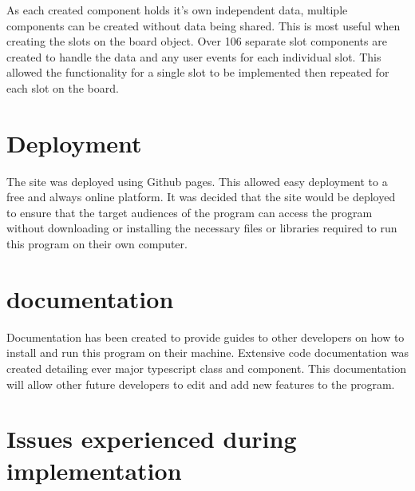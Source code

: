 \documentclass{l4proj}
\begin{document}
As each created component holds it's own independent data, multiple components can be created without data being shared. This is most useful when creating the slots on the board object. Over 106 separate slot components are created to handle the data and any user events for each individual slot. This allowed the functionality for a single slot to be implemented then repeated for each slot on the board.

\section{Deployment}
The site was deployed using Github pages. This allowed easy deployment to a free and always online platform. It was decided that the site would be deployed to ensure that the target audiences of the program can access the program without downloading or installing the necessary files or libraries required to run this program on their own computer. 

\section{documentation}
Documentation has been created to provide guides to other developers on how to install and run this program on their machine. Extensive code documentation was created detailing ever major typescript class and component. This documentation will allow other future developers to edit and add new features to the program.


\section{Issues experienced during implementation}
\end{document}
